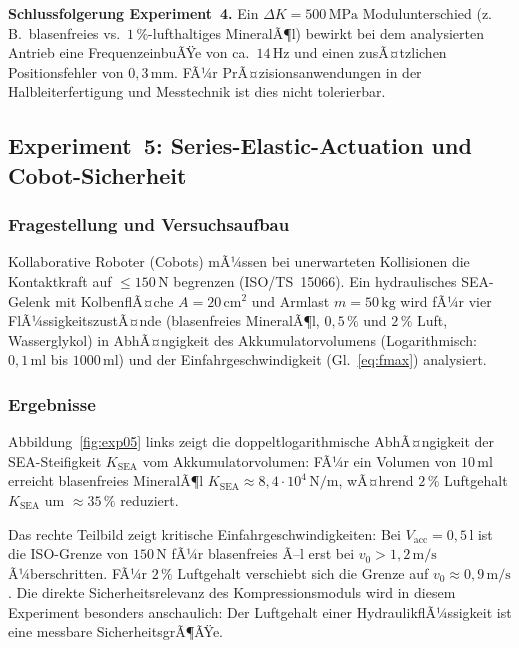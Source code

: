 ﻿\documentclass[a4paper,12pt]{scrreprt}
\theoremstyle{definition}
\begin{document}
\begin{infobox}
\textbf{Schlussfolgerung Experiment~4.}
Ein $\Delta K = 500\,\mathrm{MPa}$ Modulunterschied (z.\,B.\ blasenfreies
vs.\ $1\,\%$-lufthaltiges MineralÃ¶l) bewirkt bei dem analysierten Antrieb
eine FrequenzeinbuÃŸe von ca.\ $14\,\mathrm{Hz}$ und einen zusÃ¤tzlichen
Positionsfehler von $0{,}3\,\mathrm{mm}$. FÃ¼r PrÃ¤zisionsanwendungen in
der Halbleiterfertigung und Messtechnik ist dies nicht tolerierbar.
\end{infobox}

\subsection{Experiment~5: Series-Elastic-Actuation und Cobot-Sicherheit}
\label{sec:exp05}

\subsubsection*{Fragestellung und Versuchsaufbau}

Kollaborative Roboter (Cobots) mÃ¼ssen bei unerwarteten Kollisionen
die Kontaktkraft auf ${\leq}150\,\mathrm{N}$ begrenzen (ISO/TS~15066).
Ein hydraulisches SEA-Gelenk mit KolbenflÃ¤che $A = 20\,\mathrm{cm^2}$ und
Armlast $m = 50\,\mathrm{kg}$ wird fÃ¼r vier FlÃ¼ssigkeitszustÃ¤nde
(blasenfreies MineralÃ¶l, $0{,}5\,\%$ und $2\,\%$ Luft, Wasserglykol)
in AbhÃ¤ngigkeit des Akkumulatorvolumens (Logarithmisch: $0{,}1\,\mathrm{ml}$
bis $1000\,\mathrm{ml}$) und der Einfahrgeschwindigkeit (Gl.~\ref{eq:fmax}) analysiert.

\subsubsection*{Ergebnisse}

Abbildung~\ref{fig:exp05} links zeigt die doppeltlogarithmische AbhÃ¤ngigkeit
der SEA-Steifigkeit $K_{\mathrm{SEA}}$ vom Akkumulatorvolumen: FÃ¼r ein
Volumen von $10\,\mathrm{ml}$ erreicht blasenfreies MineralÃ¶l
$K_{\mathrm{SEA}} \approx 8{,}4 \cdot 10^4\,\mathrm{N/m}$, wÃ¤hrend
$2\,\%$ Luftgehalt $K_{\mathrm{SEA}}$ um $\approx 35\,\%$ reduziert.

Das rechte Teilbild zeigt kritische Einfahrgeschwindigkeiten: Bei
$V_{\mathrm{acc}} = 0{,}5\,\mathrm{l}$ ist die ISO-Grenze von
$150\,\mathrm{N}$ fÃ¼r blasenfreies Ã–l erst bei $v_0 > 1{,}2\,\mathrm{m/s}$
Ã¼berschritten. FÃ¼r $2\,\%$ Luftgehalt verschiebt sich die Grenze auf
$v_0 \approx 0{,}9\,\mathrm{m/s}$. Die direkte Sicherheitsrelevanz des
Kompressionsmoduls wird in diesem Experiment besonders anschaulich: Der
Luftgehalt einer HydraulikflÃ¼ssigkeit ist eine messbare SicherheitsgrÃ¶ÃŸe.
\end{document}
